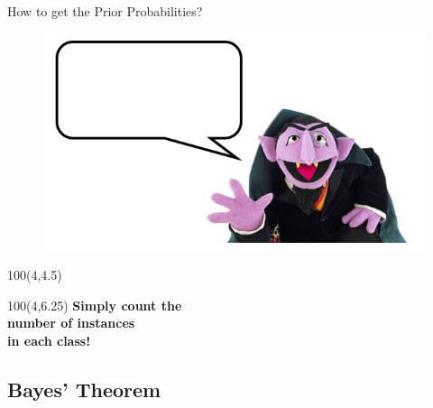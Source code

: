 \begin{frame}{How to get the Prior Probabilities?}{}
	\vspace*{4mm}
	\begin{figure}
		\centering
		\includegraphics[scale=0.6]{03_decision_theory/02_img/count_count_bubble}
	\end{figure}
	\begin{textblock}{100}(4,4.5)
		\footnotesize {}
	\end{textblock}
	\begin{textblock}{100}(4,6.25)
		\textbf{Simply count the} \\
		\textbf{number of instances} \\
		\textbf{in each class!}
	\end{textblock}
\end{frame}


\subsection{Bayes' Theorem}

